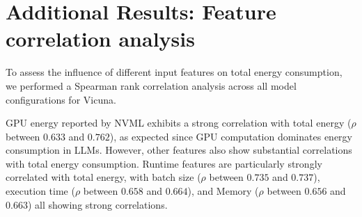 %




\section{Additional Results: Feature correlation analysis}
\label{app:correlation}




To assess the influence of different input features on total energy consumption, we performed a Spearman rank correlation analysis across all model configurations for Vicuna. %

GPU energy reported by NVML exhibits a strong correlation with total energy ($\rho$ between $0.633$ and $0.762$), as expected since GPU computation dominates energy consumption in LLMs. 
However, other features also show substantial correlations with total energy consumption. Runtime features are particularly strongly correlated with total energy, with batch size ($\rho$ between $0.735$ and $0.737$), execution time ($\rho$ between $0.658$ and $0.664$), and Memory ($\rho$ between $0.656$ and $0.663$) all showing strong correlations. 

